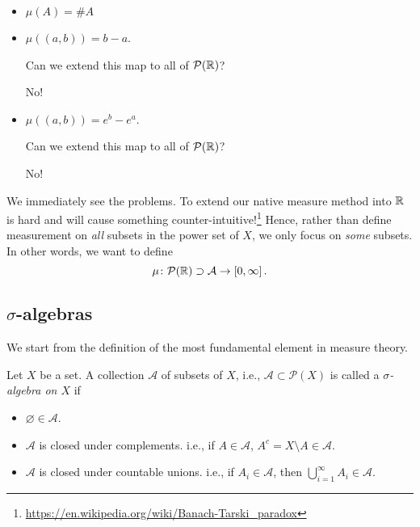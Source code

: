 \begin{eg}
\begin{enumerate}
		      \begin{itemize}
			      \item \(\mu(A) = \# A\)
			      \item \(\mu(\left(a, b\right)) = b-a\).
			            \begin{problem}
			            Can we extend this map to all of \(\mathcal{P}(\mathbb{\MakeUppercase{R}} )\)?
			            \begin{answer}
				            No!
			            \end{answer}
			            \end{problem}
			      \item \(\mu(\left(a, b\right)) = e^b - e^a\).
			            \begin{problem}
			            Can we extend this map to all of \(\mathcal{P}(\mathbb{\MakeUppercase{R}} )\)?
			            \begin{answer}
				            No!
			            \end{answer}
			            \end{problem}
		      \end{itemize}
	\end{enumerate}
\end{eg}

We immediately see the problems. To extend our native measure method into \(\mathbb{\MakeUppercase{R}} \) is hard and will cause something counter-intuitive!\footnote{\url{https://en.wikipedia.org/wiki/Banach-Tarski_paradox}}
Hence, rather than define measurement on \emph{all} subsets in the power set of \(X\), we only focus on \emph{some} subsets. In other words, we
want to define
\[
	\mu\colon \mathcal{P}(\mathbb{\MakeUppercase{R}} )\supset\mathcal{A} \to \left[0, \infty\right].
\]

\subsection{\(\sigma\)-algebras}
We start from the definition of the most fundamental element in measure theory.
\begin{definition}\label{def:sigma-algebra}
	Let \(X\) be a set. A collection \(\mathcal{A} \) of subsets of \(X\), i.e., \(\mathcal{A}\subset \mathcal{P} (X) \) is called a \emph{\(\sigma\)-algebra on \(X\)} if
	\begin{itemize}
		\item \(\varnothing \in \mathcal{A} \).
		\item \(\mathcal{A} \) is closed under complements. i.e., if \(A\in \mathcal{A} \), \(A^c = X\setminus A\in \mathcal{A} \).
		\item \(\mathcal{A} \) is closed under countable unions. i.e., if \(A_i\in \mathcal{A} \), then \(\bigcup\limits_{i=1}^{\infty} A_{i}\in \mathcal{A} \).
	\end{itemize}
\end{definition}

